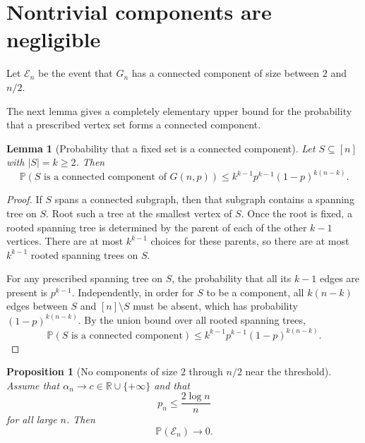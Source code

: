 \documentclass[11pt]{article}
\newcommand{\PP}{\mathbb{P}}
\theoremstyle{plain}
\newtheorem{lemma}[theorem]{Lemma}
\newtheorem{proposition}[theorem]{Proposition}
\theoremstyle{definition}
\begin{document}
\section{Nontrivial components are negligible}

Let $\mathcal{E}_n$ be the event that $G_n$ has a connected component of size between $2$ and $n/2$.

The next lemma gives a completely elementary upper bound for the probability that a prescribed vertex set forms a connected component.

\begin{lemma}[Probability that a fixed set is a connected component]
Let $S\subseteq[n]$ with $|S|=k\ge 2$.  Then
\[
\PP(S\text{ is a connected component of }G(n,p))
\le
k^{k-1} p^{k-1}(1-p)^{k(n-k)}.
\]
\end{lemma}

\begin{proof}
If $S$ spans a connected subgraph, then that subgraph contains a spanning tree on $S$.  Root such a tree at the smallest vertex of $S$.  Once the root is fixed, a rooted spanning tree is determined by the parent of each of the other $k-1$ vertices.  There are at most $k^{k-1}$ choices for these parents, so there are at most $k^{k-1}$ rooted spanning trees on $S$.

For any prescribed spanning tree on $S$, the probability that all its $k-1$ edges are present is $p^{k-1}$.  Independently, in order for $S$ to be a component, all $k(n-k)$ edges between $S$ and $[n]\setminus S$ must be absent, which has probability $(1-p)^{k(n-k)}$.  By the union bound over all rooted spanning trees,
\[
\PP(S\text{ is a connected component})
\le k^{k-1} p^{k-1}(1-p)^{k(n-k)}.
\]
\end{proof}

\begin{proposition}[No components of size $2$ through $n/2$ near the threshold]\label{prop:nosmall}
Assume that $\alpha_n\to c\in\mathbb{R}\cup\{+\infty\}$ and that
\[
p_n \le \frac{2\log n}{n}
\]
for all large $n$.  Then
\[
\PP(\mathcal{E}_n)\to 0.
\]
\end{proposition}
\end{document}
